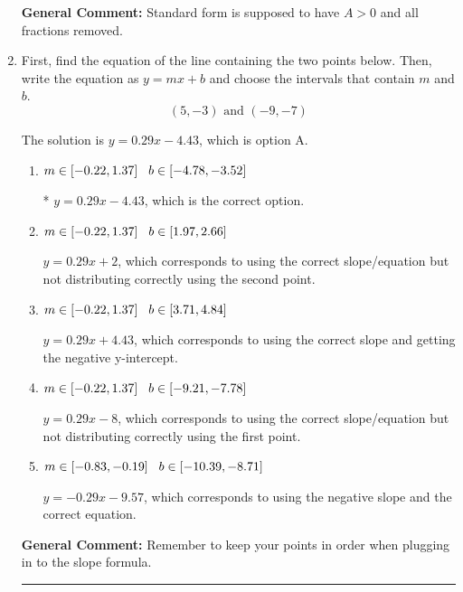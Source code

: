 \documentclass{extbook}[14pt]
\newcommand{\litem}[1]{\item #1

\rule{\textwidth}{0.4pt}}
\begin{document}
\begin{enumerate}
{\textbf{General Comment:} Standard form is supposed to have $A > 0$ and all fractions removed.
}
\litem{
First, find the equation of the line containing the two points below. Then, write the equation as $ y=mx+b $ and choose the intervals that contain $m$ and $b$.
\[ (5, -3) \text{ and } (-9, -7) \]

The solution is \( y = 0.29x -4.43 \), which is option A.\begin{enumerate}[label=\Alph*.]
\item \( m \in [-0.22, 1.37] \hspace*{3mm} b \in [-4.78, -3.52] \)

* $y = 0.29x -4.43$, which is the correct option.
\item \( m \in [-0.22, 1.37] \hspace*{3mm} b \in [1.97, 2.66] \)

 $y = 0.29x + 2$, which corresponds to using the correct slope/equation but not distributing correctly using the second point.
\item \( m \in [-0.22, 1.37] \hspace*{3mm} b \in [3.71, 4.84] \)

 $y = 0.29x + 4.43$, which corresponds to using the correct slope and getting the negative y-intercept.
\item \( m \in [-0.22, 1.37] \hspace*{3mm} b \in [-9.21, -7.78] \)

 $y = 0.29x -8$, which corresponds to using the correct slope/equation but not distributing correctly using the first point.
\item \( m \in [-0.83, -0.19] \hspace*{3mm} b \in [-10.39, -8.71] \)

 $y = -0.29x -9.57$, which corresponds to using the negative slope and the correct equation.
\end{enumerate}

\textbf{General Comment:} Remember to keep your points in order when plugging in to the slope formula.
}
\end{enumerate}
\end{document}
